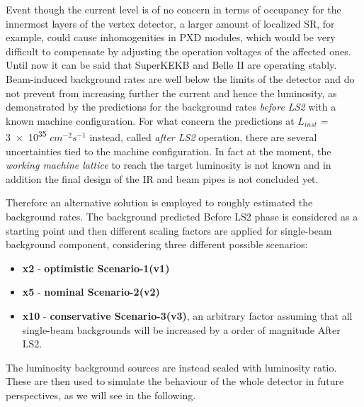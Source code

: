 \begin{comment}
\begin{figure}[h!]
\centering
\texttt{[image: bkg\_table]}
\caption{Background rate limits for Belle II detector sub-systems. The third column shows the total measured background rate in June 2021.}
\label{fig:bkg_table}
\end{figure}
\end{comment}

Event though the current level is of no concern in terms of occupancy for the innermost layers of the vertex detector, a larger amount of localized SR, for example, could cause inhomogenities in PXD modules, which would be very difficult to compensate by adjusting the operation voltages of the affected ones.\\

Until now it can be said that SuperKEKB and Belle II are operating stably. Beam-induced background rates are well below the limits of the detector and do not prevent from increasing further the current and hence the luminosity, as demonstrated by the predictions for the background rates \textit{before LS2} with a known machine configuration. 
For what concern the predictions at \textit{$L_{inst}$} = \num{3e35} $cm^{-2}s^{-1}$ instead, called \textit{after LS2} operation, there are several uncertainties tied to the machine configuration. In fact at the moment, the \emph{working machine lattice} to reach the target luminosity is not known and in addition the final design of the IR and beam pipes is not concluded yet.

Therefore an alternative solution is employed to roughly estimated the background rates. The background predicted Before LS2 phase is considered as a starting point and then different scaling factors are applied for single-beam background component, considering three different possible scenarios:

\begin{itemize}
\item \textbf{x2} - \textbf{optimistic Scenario-1(v1)}
\item \textbf{x5} - \textbf{nominal Scenario-2(v2)}
\item \textbf{x10} - \textbf{conservative Scenario-3(v3)}, an arbitrary factor assuming that all single-beam backgrounds will be increased by a order of magnitude After LS2.
\end{itemize}

The luminosity background sources are instead scaled with luminosity ratio.
These are then used to simulate the behaviour of the whole detector in future perspectives, as we will see in the following.


